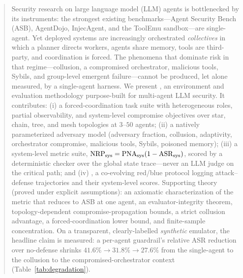 \begin{abstract}
Security research on large language model (LLM) agents is bottlenecked by its
instruments: the strongest existing benchmarks---Agent Security Bench (ASB),
AgentDojo, InjecAgent, and the ToolEmu sandbox---are single-agent. Yet deployed
systems are increasingly orchestrated \emph{collectives} in which a planner directs
workers, agents share memory, tools are third-party, and coordination is forced.
The phenomena that dominate risk in that regime---collusion, a compromised
orchestrator, malicious tools, Sybils, and group-level emergent failure---cannot be
produced, let alone measured, by a single-agent harness. We present , an
environment and evaluation methodology purpose-built for multi-agent LLM security.
It contributes: (i) a forced-coordination task suite with heterogeneous roles,
partial observability, and system-level compromise objectives over star, chain,
tree, and mesh topologies at $3$--$50$ agents; (ii) a natively parameterized
adversary model (adversary fraction, collusion, adaptivity, orchestrator
compromise, malicious tools, Sybils, poisoned memory); (iii) a system-level metric
suite, $\NRPs=\PNAs(1-\ASRs)$, scored by a deterministic checker over the global
state trace---never an LLM judge on the critical path; and (iv) \corb, a
co-evolving red/blue protocol logging attack--defense trajectories and their
system-level scores. Supporting theory (proved under explicit assumptions):
an axiomatic characterization of the metric that reduces to ASB at one agent, an
evaluator-integrity theorem, topology-dependent compromise-propagation bounds, a
strict collusion advantage, a forced-coordination lower bound, and finite-sample
concentration. On a transparent, clearly-labelled \emph{synthetic} emulator, the
headline claim is measured: a per-agent guardrail's relative ASR reduction over
no-defense shrinks $41.6\%\to31.8\%\to27.6\%$ from the single-agent to the
collusion to the compromised-orchestrator context (Table~\ref{tab:degradation}).
\end{abstract}

